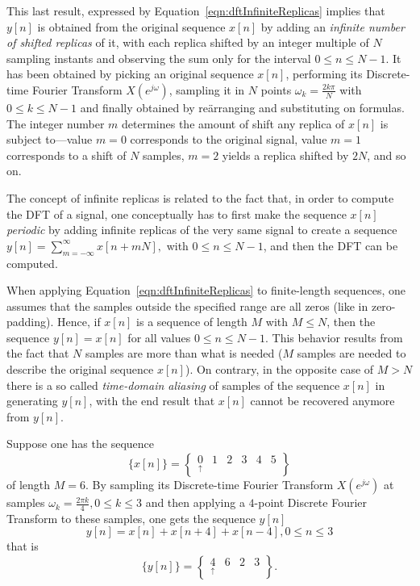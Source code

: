 \documentclass[\documentfontsize, twocolumn]{\classname}
\begin{document}
This last result, expressed by Equation~\ref{eqn:dftInfiniteReplicas} implies that $y[n]$ is obtained from the original sequence $x[n]$ by adding an \emph{infinite number of shifted replicas} of it, with each replica shifted by an integer multiple of $N$ sampling instants and observing the sum only for the interval $0 \leq n \leq N-1$. It has been obtained by picking an original sequence $x[n]$, performing its Discrete-time Fourier Transform $X(e^{j\omega})$, sampling it in $N$ points $\omega_k = \frac{2k\pi}{N}$ with $0 \leq k \leq N-1$ and finally obtained by re\"arranging and substituting on formulas. The integer number $m$ determines the amount of shift any replica of $x[n]$ is subject to---value $m=0$ corresponds to the original signal, value $m=1$ corresponds to a shift of $N$ samples, $m=2$ yields a replica shifted by $2N$, and so on.

The concept of infinite replicas is related to the fact that, in order to compute the DFT of a signal, one conceptually has to first make the sequence $x[n]$ \emph{periodic} by adding infinite replicas of the very same signal to create a sequence $y[n] = \sum_{m=-\infty}^{\infty} x[n + mN],$ with $0 \leq n \leq N-1$, and then the DFT can be computed.

When applying Equation~\ref{eqn:dftInfiniteReplicas} to finite-length sequences, one assumes that the samples outside the specified range are all zeros (like in zero-padding). Hence, if $x[n]$ is a sequence of length $M$ with $M \leq N$, then the sequence $y[n] = x[n]$ for all values $0 \leq n \leq N-1$. This behavior results from the fact that $N$ samples are more than what is needed ($M$ samples are needed to describe the original sequence $x[n]$). On contrary, in the opposite case of $M > N$ there is a so called \emph{time-domain aliasing} of samples of the sequence $x[n]$ in generating $y[n]$, with the end result that $x[n]$ cannot be recovered anymore from $y[n]$.

Suppose one has the sequence
\[\{x[n]\} = \begin{Bmatrix} \underset{\uparrow}{0} & 1 & 2 & 3 & 4 & 5\end{Bmatrix}\]
of length $M=6$. By sampling its Discrete-time Fourier Transform $X(e^{j\omega})$ at samples $\omega_k = \frac{2\pi k}{4}, 0 \leq k \leq 3$ and then applying a $4$-point Discrete Fourier Transform to these samples, one gets the sequence $y[n]$
\[
    y[n] = x[n] + x[n+4] + x[n-4], 0 \leq n \leq 3
\]
that is
\[
    \{y[n]\} = \begin{Bmatrix}\underset{\uparrow}{4} & 6 & 2 & 3\end{Bmatrix}.
\]
\end{document}
